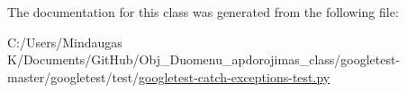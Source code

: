 The documentation for this class was generated from the following file\+:\begin{DoxyCompactItemize}
\item 
C\+:/\+Users/\+Mindaugas K/\+Documents/\+Git\+Hub/\+Obj\+\_\+\+Duomenu\+\_\+apdorojimas\+\_\+class/googletest-\/master/googletest/test/\mbox{\hyperlink{googletest-master_2googletest_2test_2googletest-catch-exceptions-test_8py}{googletest-\/catch-\/exceptions-\/test.\+py}}\end{DoxyCompactItemize}
